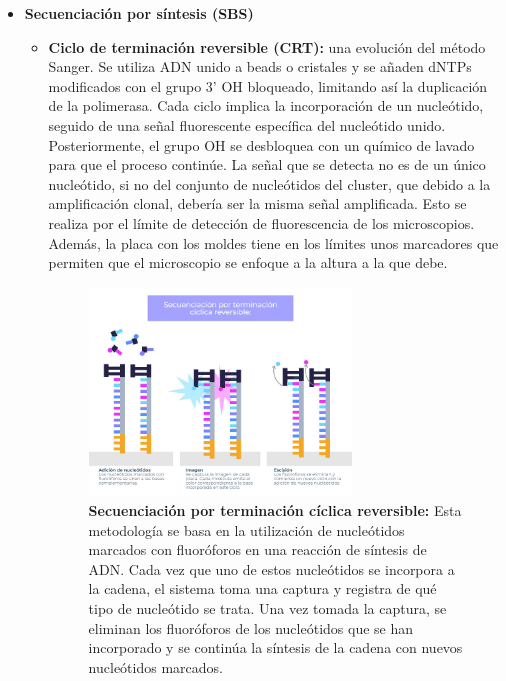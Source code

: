 \begin{itemize}
\item \textbf{Secuenciación por síntesis (SBS)}
\begin{itemize}
\item \textbf{Ciclo de terminación reversible (CRT):} una evolución del método Sanger. Se utiliza ADN unido a beads o cristales y se añaden dNTPs modificados con el grupo 3’ OH bloqueado, limitando así la duplicación de la polimerasa. Cada ciclo implica la incorporación de un nucleótido, seguido de una señal fluorescente específica del nucleótido unido. Posteriormente, el grupo OH se desbloquea con un químico de lavado para que el proceso continúe. La señal que se detecta no es de un único nucleótido, si no del conjunto de nucleótidos del cluster, que debido a la amplificación clonal, debería ser la misma señal amplificada. Esto se realiza por el límite de detección de fluorescencia de los microscopios. Además, la placa con los moldes tiene en los límites unos marcadores que permiten que el microscopio se enfoque a la altura a la que debe. 

\begin{figure}[htbp]
\centering
\includegraphics[width = 0.7\textwidth]{figs/secuenciacion-terminacion-ciclica-reversible.jpg}
\caption{\textbf{Secuenciación por terminación cíclica reversible:}
Esta metodología se basa en la utilización de nucleótidos marcados con fluoróforos en una reacción de síntesis de ADN. Cada vez que uno de estos nucleótidos se incorpora a la cadena, el sistema toma una captura y registra de qué tipo de nucleótido se trata. Una vez tomada la captura, se eliminan los fluoróforos de los nucleótidos que se han incorporado y se continúa la síntesis de la cadena con nuevos nucleótidos marcados. }
\end{figure}


\end{itemize}
\end{itemize}

